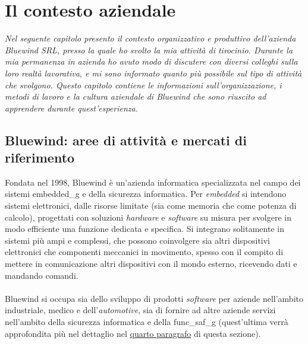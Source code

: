 \chapter{Il contesto aziendale}
\label{chap:introduzione}
\noindent
\textit{Nel seguente capitolo presento il contesto organizzativo e produttivo dell'azienda Bluewind SRL, presso la quale ho svolto la mia attività di tirocinio.
Durante la mia permanenza in azienda ho avuto modo di discutere con diversi colleghi sulla loro realtà lavorativa, e mi sono informato quanto più possibile sul tipo di attività che svolgono.
Questo capitolo contiene le informazioni sull'organizzazione, i metodi di lavoro e la cultura aziendale di Bluewind che sono riuscito ad apprendere durante quest'esperienza.}

\section{Bluewind: aree di attività e mercati di riferimento}

\noindent
Fondata nel 1998, Bluewind è un'azienda informatica specializzata nel campo dei sistemi \gls{embedded_g} e della sicurezza informatica.
Per \textit{embedded} si intendono sistemi elettronici, dalle risorse limitate (sia come memoria che come potenza di calcolo), progettati con soluzioni \textit{hardware} e \textit{software} su misura per svolgere in modo efficiente una funzione dedicata e specifica.
Si integrano solitamente in sistemi più ampi e complessi, che possono coinvolgere sia altri dispositivi elettronici che componenti meccanici in movimento, spesso con il compito di mettere in comunicazione altri dispositivi con il mondo esterno, ricevendo dati e mandando comandi.\\\\
Bluewind si occupa sia dello sviluppo di prodotti \textit{software} per aziende nell'ambito industriale, medico e dell'\textit{automotive}, sia di fornire ad altre aziende servizi nell'ambito della sicurezza informatica e della \gls{func_saf_g} (quest'ultima verrà approfondita più nel dettaglio nel \hyperlink{ref:spiegazione_fun_saf}{quarto paragrafo} di questa sezione).\\

